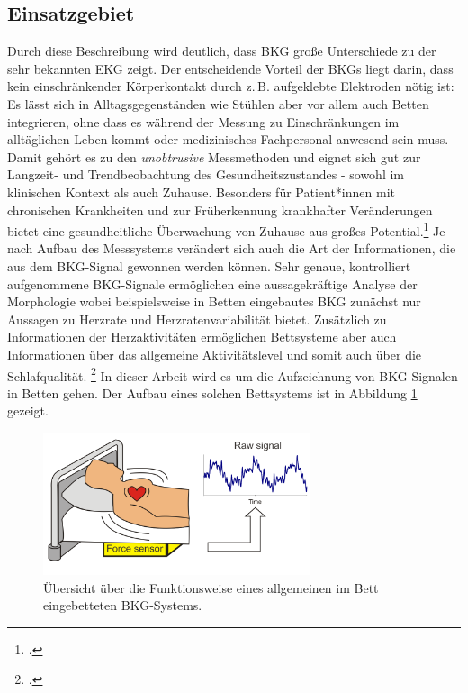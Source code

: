 	\subsection{Einsatzgebiet}
	
	Durch diese Beschreibung wird deutlich, dass \ac{BKG} große Unterschiede zu der sehr bekannten \ac{EKG} zeigt. Der entscheidende Vorteil der \ac{BKG}s liegt darin, dass kein einschränkender Körperkontakt durch z.\,B. aufgeklebte Elektroden nötig ist: Es lässt sich in Alltagsgegenständen wie Stühlen aber vor allem auch Betten integrieren, ohne dass es während der Messung zu Einschränkungen im alltäglichen Leben kommt oder medizinisches Fachpersonal anwesend sein muss. Damit gehört es zu den \textit{unobtrusive} Messmethoden und eignet sich gut zur Langzeit- und Trendbeobachtung des Gesundheitszustandes - sowohl im klinischen Kontext als auch Zuhause. Besonders für Patient*innen mit chronischen Krankheiten und zur Früherkennung krankhafter Veränderungen bietet eine gesundheitliche Überwachung von Zuhause aus großes Potential.\footcite{Inan2015} Je nach Aufbau des Messsystems verändert sich auch die Art der Informationen, die aus dem \ac{BKG}-Signal gewonnen werden können. Sehr genaue, kontrolliert aufgenommene \ac{BKG}-Signale ermöglichen eine aussagekräftige Analyse der Morphologie wobei beispielsweise in Betten eingebautes \ac{BKG} zunächst nur Aussagen zu Herzrate und Herzratenvariabilität bietet. Zusätzlich zu Informationen der Herzaktivitäten ermöglichen Bettsysteme aber auch Informationen über das allgemeine Aktivitätslevel und somit auch über die Schlafqualität. \footcite{Bruser2011} In dieser Arbeit wird es um die Aufzeichnung von \ac{BKG}-Signalen in Betten gehen. Der Aufbau eines solchen Bettsystems ist in Abbildung \ref{fig:bcgbed} gezeigt.
	
	 \begin{figure}[H]
	 	\centering
		\includegraphics[width=0.7\textwidth]{pic/bcgBed.png}
		\caption[Übersicht über die Funktionsweise eines allgemeinen im Bett eingebetteten \ac{BKG}-Systems]{Übersicht über die Funktionsweise eines allgemeinen im Bett eingebetteten \ac{BKG}-Systems.\protect\footnotemark}
		\label{fig:bcgbed}
	\end{figure}
	
